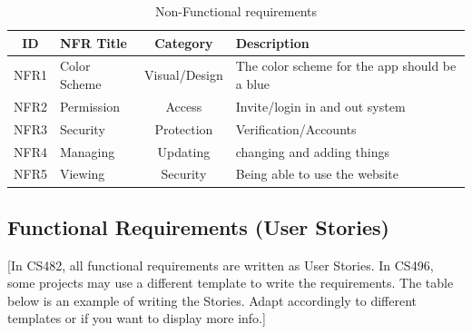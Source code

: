 \documentclass{article}
\begin{document}
\begin{table}[h!]
\centering
\begin{tabular}{c l c p{9cm}}
\hline
\textbf{ID} & \textbf{NFR Title} & \textbf{Category} & \textbf{Description} \\
\hline
NFR1 & Color Scheme & Visual/Design & The color scheme for the app should be a blue \\ \hline
NFR2 & Permission & Access & Invite/login in and out system \\ \hline
NFR3 & Security & Protection & Verification/Accounts \\ \hline
NFR4 & Managing & Updating  & changing and adding things  \\ \hline
NFR5 & Viewing & Security & Being able to use the website \\ \hline
\end{tabular}
\caption{Non-Functional requirements}
\end{table}


\subsection{Functional Requirements (User Stories)}
[In CS482, all functional requirements are written as User Stories. In CS496, some projects may use a different template to write the requirements. The table below is an example of writing the Stories. Adapt accordingly to different templates or if you want to display more info.]
\newpage
\end{document}

